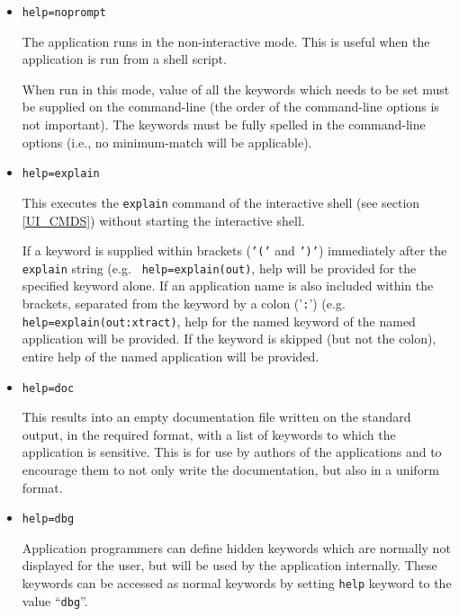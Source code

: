 \documentclass[11pt]{article}
\begin{document}
\begin{itemize}

\item {\tt help=noprompt}
  
  The application runs in the non-interactive mode.  This is useful
  when the application is run from a shell script.
  
  When run in this mode, value of all the keywords which needs to be
  set must be supplied on the command-line (the order of the
  command-line options is not important).  The keywords must be fully
  spelled in the command-line options (i.e., no minimum-match will be
  applicable).

\item {\tt help=explain}
  
  This executes the {\tt explain} command of the interactive shell
  (see section \ref{UI_CMDS}) without starting the interactive shell.
  
  If a keyword is supplied within brackets ({\tt '('} and {\tt ')'})
  immediately after the {\tt explain} string (e.g. {\tt
    help=explain(out)}, help will be provided for the specified
  keyword alone.  If an application name is also included within the
  brackets, separated from the keyword by a colon ('{\tt :}') (e.g.
  {\tt help=explain(out:xtract)}, help for the named keyword of the
  named application will be provided.  If the keyword is skipped (but
  not the colon), entire help of the named application will be
  provided.

\item {\tt help=doc}
  
  This results into an empty documentation file written on the
  standard output, in the required format, with a list of keywords to
  which the application is sensitive.  This is for use by authors of
  the applications and to encourage them to not only write the
  documentation, but also in a uniform format.

\item {\tt help=dbg}
  
  Application programmers can define hidden keywords which are
  normally not displayed for the user, but will be used by the
  application internally.  These keywords can be accessed as normal
  keywords by setting {\tt help} keyword to the value ``{\tt dbg}''.

\end{itemize}
\end{document}
